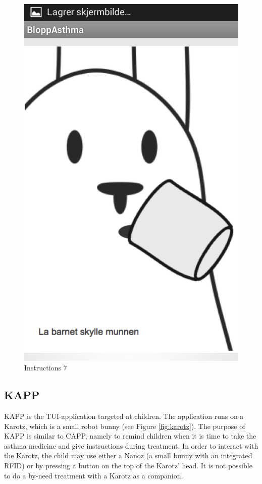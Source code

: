 \begin{figure}[H]
	\begin{minipage}[b]{0.3\linewidth}
		\centering
		\includegraphics[width=0.20\paperwidth]{Pictures/app-screenshots/instructions-7.png}
		\caption{Instructions 7}
		\label{fig:instructions-7}
	\end{minipage}
\end{figure}


\subsection{KAPP}
\label{sec:description-kapp}
KAPP is the TUI-application targeted at children. The application runs on a Karotz, which is a small robot bunny (see Figure \ref{fig:karotz}). The purpose of KAPP is similar to CAPP, namely to remind children when it is time to take the asthma medicine and give instructions during treatment. In order to interact with the Karotz, the child may use either a Nanoz (a small bunny with an integrated RFID) or by pressing a button on the top of the Karotz' head. It is not possible to do a by-need treatment with a Karotz as a companion. 



